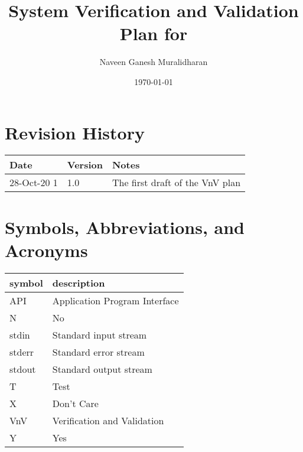 \documentclass[12pt, titlepage]{article}
\begin{document}
\title{System Verification and Validation Plan for \progname{}} 
\author{Naveen Ganesh Muralidharan}
\date{\today}
	
\maketitle


\section{Revision History}

\begin{tabularx}{\textwidth}{p{3cm}p{2cm}X}
\toprule {\bf Date} & {\bf Version} & {\bf Notes}\\
\midrule
28-Oct-20 1 & 1.0 & The first draft of the VnV plan\\
\bottomrule
\end{tabularx}

\newpage

\tableofcontents

\listoftables

\listoffigures

\newpage

\section{Symbols, Abbreviations, and Acronyms}

\renewcommand{\arraystretch}{1.2}
\begin{tabular}{l l} 
  \toprule		
  \textbf{symbol} & \textbf{description}\\
  \midrule 
  API & Application Program Interface\\
  N & No\\
  stdin & Standard input stream\\
  stderr & Standard error stream\\
  stdout & Standard output stream\\
  T & Test\\
  X & Don't Care\\
  VnV & Verification and Validation\\
  Y & Yes\\
  \bottomrule
\end{tabular}\\

\end{document}

